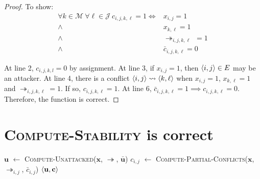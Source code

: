 \begin{proof}
	To show:
	\begin{align*}
		\forall k\in\mathcal{M}\ \forall\ell\in\mathcal{J}\ c_{i,j,k,\ell}=1\iff&x_{i,j}=1\\
		\land\ &x_{k,\ell}=1\\
		\land\ &\twoheadrightarrow_{i,j,k,\ell}\ =1\\
		\land\ &\bar{c}_{i,j,k,\ell}=0
	\end{align*}
	
	At line 2, $c_{i,j,k,l}=0$ by assignment. At line 3, if $x_{i,j}=1$, then $\langle{i},{j}\rangle\in E$ may be an attacker. At line 4, there is a conflict $\langle{i},{j}\rangle\rightsquigarrow\langle{k},{\ell}\rangle$ when $x_{i,j}=1$, $x_{k,\ell}=1$ and $\twoheadrightarrow_{i,j,k,\ell}=1$. If so, $c_{i,j,k,\ell}=1$. At line 6, $\bar{c}_{i,j,k,\ell}=1\implies c_{i,j,k,\ell}=0$. Therefore, the function is correct.

\end{proof}

\section{\textsc{Compute-Stability} is correct}

\begin{algorithm}[H]
	\begin{algorithmic}[1]
		\State $\mathbf{u}$ $\gets$ \textsc{Compute-Unattacked}($\mathbf{x}$, $\twoheadrightarrow$, $\bar{\mathbf{u}}$)
		\State $c_{i,j}$ $\gets$ \textsc{Compute-Partial-Conflicts}($\mathbf{x}$, $\twoheadrightarrow_{i,j}$, $\bar{c}_{i,j}$)
		\EndFor			
		\State \Return $\langle{\mathbf{u}},{\mathbf{c}}\rangle$
		\EndFunction
	\end{algorithmic}
\end{algorithm}

